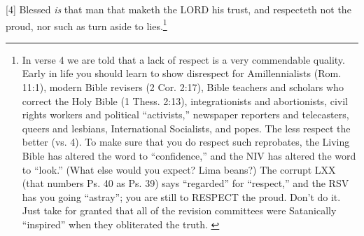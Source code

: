 [4] \textcolor[rgb]{0.00,0.00,1.00}{Blessed \emph{is} that man that maketh the LORD his trust, and respecteth not the proud, nor such as turn aside to lies.}\footnote{In verse 4 we are told that a lack of respect is a very commendable quality. Early in life you should learn to show disrespect for Amillennialists (Rom. 11:1), modern Bible revisers (2 Cor. 2:17), Bible teachers and scholars who correct the Holy Bible (1 Thess. 2:13), integrationists and abortionists, civil rights workers and political “activists,” newspaper reporters and telecasters, queers and lesbians, International Socialists, and popes. The less respect the better (vs. 4). To make sure that you do respect such reprobates, the Living Bible has altered the word to “confidence,” and the NIV has altered the word to “look.” (What else would you expect? Lima beans?) The corrupt LXX (that numbers Ps. 40 as Ps. 39) says “regarded” for “respect,” and the RSV has you going “astray”; you are still to RESPECT the proud. Don’t do it. Just take for granted that all of the revision committees were Satanically “inspired” when they obliterated the truth.  \cite{Ruckman1992Psalms}}
